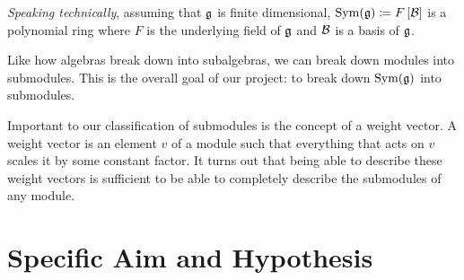 \documentclass[11pt, reqno]{amsart}
\begin{document}
\emph{Speaking technically}, assuming that $\mathfrak{g}$ is finite dimensional, $\operatorname{Sym}(\mathfrak{g})\coloneqq F\left[ \mathcal{B} \right]$ 
is a polynomial ring where $F$ is the underlying field of $\mathfrak{g}$ and $\mathcal{B}$ is a basis of $\mathfrak{g}$.



Like how algebras break down into subalgebras, we can break down modules into
submodules. This is the overall goal of our project: to break down $\operatorname{Sym}(\mathfrak{g})$
into submodules.

Important to our classification of submodules is the concept of a weight vector.
A weight vector is an element $v$ of a module such that everything that acts on
$v$ scales it by some constant factor. It turns out that being able to describe
these weight vectors is sufficient to be able to completely describe the
submodules of any module.






\section{Specific Aim and Hypothesis}
\end{document}

